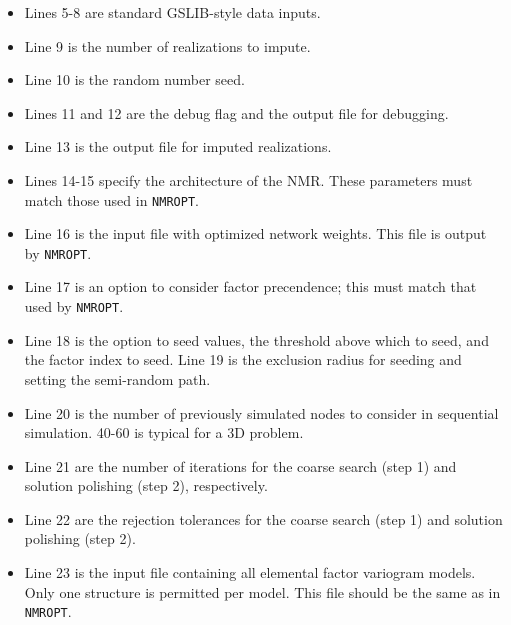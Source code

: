 \begin{itemize}[noitemsep]
   \item Lines 5-8 are standard GSLIB-style data inputs.
   \item Line 9 is the number of realizations to impute.
   \item Line 10 is the random number seed.
   \item Lines 11 and 12 are the debug flag and the output file for debugging.
   \item Line 13 is the output file for imputed realizations.
   \item Lines 14-15 specify the architecture of the NMR. These parameters must match those used in \texttt{NMROPT}.
   \item Line 16 is the input file with optimized network weights. This file is output by \texttt{NMROPT}.
   \item Line 17 is an option to consider factor precendence; this must match that used by \texttt{NMROPT}.
   \item Line 18 is the option to seed values, the threshold above which to seed, and the factor index to seed. Line 19 is the exclusion radius for seeding and setting the semi-random path.
   \item Line 20 is the number of previously simulated nodes to consider in sequential simulation. 40-60 is typical for a 3D problem.
   \item Line 21 are the number of iterations for the coarse search (step 1) and solution polishing (step 2), respectively.
   \item Line 22 are the rejection tolerances for the coarse search (step 1) and solution polishing (step 2).
   \item Line 23 is the input file containing all elemental factor variogram models. Only one structure is permitted per model. This file should be the same as in \texttt{NMROPT}.
\end{itemize}




